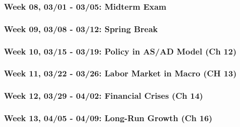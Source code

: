 \documentclass[11pt,]{article}
\begin{document}
\hypertarget{week-08-0301---0305-midterm-exam}{%
\subsubsection*{\texorpdfstring{Week 08, 03/01 - 03/05: \textbf{Midterm Exam}}{Week 08, 03/01 - 03/05: Midterm Exam}}\label{week-08-0301---0305-midterm-exam}}

\hypertarget{week-09-0308---0312-spring-break}{%
\subsubsection*{Week 09, 03/08 - 03/12: Spring Break}\label{week-09-0308---0312-spring-break}}

\hypertarget{week-10-0315---0319-policy-in-asad-model-ch-12}{%
\subsubsection*{Week 10, 03/15 - 03/19: Policy in AS/AD Model (Ch 12)}\label{week-10-0315---0319-policy-in-asad-model-ch-12}}

\hypertarget{week-11-0322---0326-labor-market-in-macro-ch-13}{%
\subsubsection*{Week 11, 03/22 - 03/26: Labor Market in Macro (CH 13)}\label{week-11-0322---0326-labor-market-in-macro-ch-13}}

\hypertarget{week-12-0329---0402-financial-crises-ch-14}{%
\subsubsection*{Week 12, 03/29 - 04/02: Financial Crises (Ch 14)}\label{week-12-0329---0402-financial-crises-ch-14}}

\hypertarget{week-13-0405---0409-long-run-growth-ch-16}{%
\subsubsection*{Week 13, 04/05 - 04/09: Long-Run Growth (Ch 16)}\label{week-13-0405---0409-long-run-growth-ch-16}}
\end{document}
